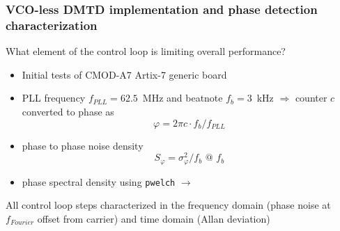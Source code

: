 \documentclass[compress,10pt,aspectratio=169]{beamer}
\begin{document}
\begin{frame}[fragile]
\begin{minipage}[t]{\linewidth}
\begin{minipage}{.49\linewidth}
\end{minipage}
\end{minipage}
\end{frame}

\begin{frame}[fragile]\frametitle{VCO-less DMTD implementation and phase detection characterization}

What element of the control loop is limiting overall performance?

\vspace{-0.3cm}
\begin{minipage}[t]{1.06\linewidth}
\begin{minipage}{.49\linewidth}


\begin{itemize}
\item Initial tests of CMOD-A7 Artix-7 generic board
\item PLL frequency $f_{PLL}=62.5$~MHz and beatnote $f_b=3$~kHz $\Rightarrow$ counter $c$ converted
to phase as $$\varphi=2\pi c\cdot f_b/f_{PLL}$$
\item phase to phase noise density $$S_\varphi=\sigma^2_\varphi/f_b\mbox{ @ }f_b$$
\item phase spectral density using {\tt pwelch} $\longrightarrow$
\end{itemize}
\end{minipage}
\begin{minipage}{.49\linewidth}
\vspace{0.6cm}
All control loop steps characterized in the frequency domain (phase noise
at $f_{Fourier}$ offset from carrier) and time domain (Allan deviation)


\end{minipage}
\end{minipage}
\end{frame}
\end{document}
